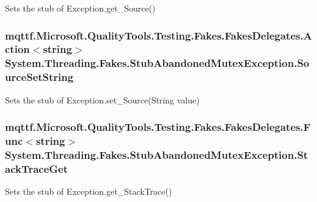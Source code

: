 Sets the stub of Exception.\-get\-\_\-\-Source()

\hypertarget{class_system_1_1_threading_1_1_fakes_1_1_stub_abandoned_mutex_exception_a32a553353d79600c316aa4932f31f61d}{
\subsubsection[{Source\-Set\-String}]{\setlength{\rightskip}{0pt plus 5cm}mqttf.\-Microsoft.\-Quality\-Tools.\-Testing.\-Fakes.\-Fakes\-Delegates.\-Action$<$string$>$ System.\-Threading.\-Fakes.\-Stub\-Abandoned\-Mutex\-Exception.\-Source\-Set\-String}}\label{class_system_1_1_threading_1_1_fakes_1_1_stub_abandoned_mutex_exception_a32a553353d79600c316aa4932f31f61d}


Sets the stub of Exception.\-set\-\_\-\-Source(\-String value)

\hypertarget{class_system_1_1_threading_1_1_fakes_1_1_stub_abandoned_mutex_exception_a820a9bead8986dfc0a0aaf675eff22cf}{
\subsubsection[{Stack\-Trace\-Get}]{\setlength{\rightskip}{0pt plus 5cm}mqttf.\-Microsoft.\-Quality\-Tools.\-Testing.\-Fakes.\-Fakes\-Delegates.\-Func$<$string$>$ System.\-Threading.\-Fakes.\-Stub\-Abandoned\-Mutex\-Exception.\-Stack\-Trace\-Get}}\label{class_system_1_1_threading_1_1_fakes_1_1_stub_abandoned_mutex_exception_a820a9bead8986dfc0a0aaf675eff22cf}


Sets the stub of Exception.\-get\-\_\-\-Stack\-Trace()


